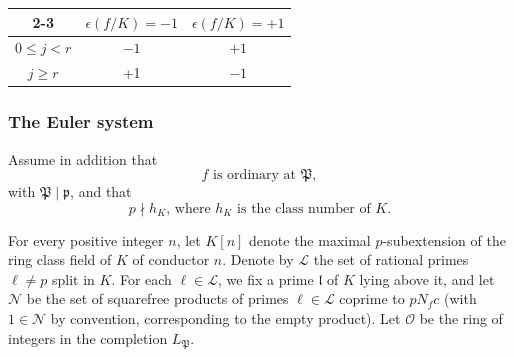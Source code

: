 \documentclass[10pt,letterpaper]{amsart}
\theoremstyle{plain}
\theoremstyle{definition}
\theoremstyle{definition}
\theoremstyle{plain}
\theoremstyle{plain}
\theoremstyle{plain}
\theoremstyle{remark}
\numberwithin{equation}{section}
\newcommand{\pp}{\mathfrak{p}}
\newcommand{\ppbar}{\bar{\mathfrak{p}}}
\def\cO{\mathcal O}
\begin{document}
{\begin{center}
\begin{tabular}{c|c|c|}
\cline{2-3}
  & $\epsilon(f/K)=-1$ & $\epsilon(f/K)=+1$ \\
 \hline
\multicolumn{1}{|c|}{$0\leq j<r$} & $-1$ & $+1$  \\
 \hline
 \multicolumn{1}{|c|}{$j\geq r$} & +1 & $-1$  \\
 \hline
\end{tabular}
\end{center}

\subsubsection{The Euler system}

Assume in addition that 
\begin{equation}\label{eq:ord}
\textrm{$f$ is ordinary at $\mathfrak{P}$},\tag{ord}
\end{equation}
with $\mathfrak{P}\mid\pp$, 
and that
\begin{equation}\label{eq:cn}
\textrm{$p\nmid h_K$, where $h_K$ is the class number of $K$.}\tag{cn}
\end{equation}
%

For every positive integer $n$, let $K[n]$ denote the maximal $p$-subextension of the ring class field of $K$ of conductor $n$. Denote by $\mathcal{L}$ the set of rational primes $\ell\neq p$ split in $K$. For each $\ell\in\mathcal{L}$, we fix a prime $\mathfrak{l}$ of $K$ lying above it, and let $\mathcal{N}$ be the set of squarefree products of primes $\ell\in\mathcal{L}$ coprime to $pN_fc$ (with  $1\in\mathcal{N}$ by convention, corresponding to the empty product). Let $\cO$ be the ring of integers in the completion $L_\mathfrak{P}$. 
 
}
\end{document}
